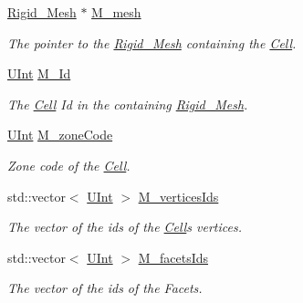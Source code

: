 \begin{DoxyCompactItemize}
\item 
\hyperlink{classFVCode3D_1_1Rigid__Mesh}{Rigid\+\_\+\+Mesh} $\ast$ \hyperlink{classFVCode3D_1_1Rigid__Mesh_1_1Cell_ad4a1033c8e506b29487f2be4c4d69c0d}{M\+\_\+mesh}
\begin{DoxyCompactList}\small\item\em The pointer to the \hyperlink{classFVCode3D_1_1Rigid__Mesh}{Rigid\+\_\+\+Mesh} containing the \hyperlink{classFVCode3D_1_1Rigid__Mesh_1_1Cell}{Cell}. \end{DoxyCompactList}\item 
\hyperlink{namespaceFVCode3D_a4bf7e328c75d0fd504050d040ebe9eda}{U\+Int} \hyperlink{classFVCode3D_1_1Rigid__Mesh_1_1Cell_a69cd2ee5b40a1ccc5cb62c529c7abfb2}{M\+\_\+\+Id}
\begin{DoxyCompactList}\small\item\em The \hyperlink{classFVCode3D_1_1Rigid__Mesh_1_1Cell}{Cell} Id in the containing \hyperlink{classFVCode3D_1_1Rigid__Mesh}{Rigid\+\_\+\+Mesh}. \end{DoxyCompactList}\item 
\hyperlink{namespaceFVCode3D_a4bf7e328c75d0fd504050d040ebe9eda}{U\+Int} \hyperlink{classFVCode3D_1_1Rigid__Mesh_1_1Cell_aa0db94ef04ad17d564ba7fe53f7979ab}{M\+\_\+zone\+Code}
\begin{DoxyCompactList}\small\item\em Zone code of the \hyperlink{classFVCode3D_1_1Rigid__Mesh_1_1Cell}{Cell}. \end{DoxyCompactList}\item 
std\+::vector$<$ \hyperlink{namespaceFVCode3D_a4bf7e328c75d0fd504050d040ebe9eda}{U\+Int} $>$ \hyperlink{classFVCode3D_1_1Rigid__Mesh_1_1Cell_a24b548a39f78eec19b66d6fe702409e4}{M\+\_\+vertices\+Ids}
\begin{DoxyCompactList}\small\item\em The vector of the ids of the \hyperlink{classFVCode3D_1_1Rigid__Mesh_1_1Cell}{Cell}\textquotesingle{}s vertices. \end{DoxyCompactList}\item 
std\+::vector$<$ \hyperlink{namespaceFVCode3D_a4bf7e328c75d0fd504050d040ebe9eda}{U\+Int} $>$ \hyperlink{classFVCode3D_1_1Rigid__Mesh_1_1Cell_a9484ef98b77a1e7588b29baac5cf27db}{M\+\_\+facets\+Ids}
\begin{DoxyCompactList}\small\item\em The vector of the ids of the Facets. \end{DoxyCompactList}\item 

\end{DoxyCompactItemize}
